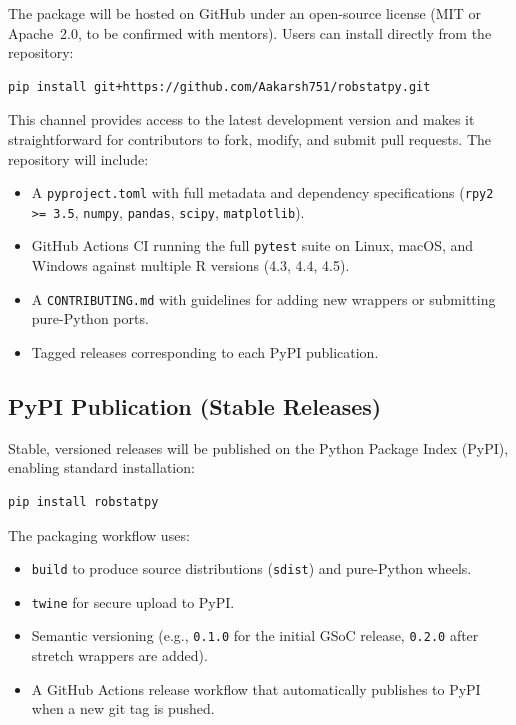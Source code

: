 \documentclass[11pt, a4paper]{article}
\begin{document}
The package will be hosted on GitHub under an open-source license
(MIT or Apache~2.0, to be confirmed with mentors).
Users can install directly from the repository:

\begin{lstlisting}[style=python, title={\footnotesize GitHub installation}, numbers=none]
pip install git+https://github.com/Aakarsh751/robstatpy.git
\end{lstlisting}

\noindent
This channel provides access to the latest development version and
makes it straightforward for contributors to fork, modify, and submit
pull requests.
The repository will include:
\begin{itemize}[leftmargin=1.5em, itemsep=2pt]
  \item A \texttt{pyproject.toml} with full metadata and dependency
    specifications (\texttt{rpy2 >= 3.5}, \texttt{numpy},
    \texttt{pandas}, \texttt{scipy}, \texttt{matplotlib}).
  \item GitHub Actions CI running the full \texttt{pytest} suite on
    Linux, macOS, and Windows against multiple R versions (4.3, 4.4,
    4.5).
  \item A \texttt{CONTRIBUTING.md} with guidelines for adding new
    wrappers or submitting pure-Python ports.
  \item Tagged releases corresponding to each PyPI publication.
\end{itemize}

\subsection{PyPI Publication (Stable Releases)}

Stable, versioned releases will be published on the Python Package Index
(PyPI), enabling standard installation:

\begin{lstlisting}[style=python, title={\footnotesize PyPI installation}, numbers=none]
pip install robstatpy
\end{lstlisting}

\noindent
The packaging workflow uses:
\begin{itemize}[leftmargin=1.5em, itemsep=2pt]
  \item \texttt{build} to produce source distributions (\texttt{sdist})
    and pure-Python wheels.
  \item \texttt{twine} for secure upload to PyPI.
  \item Semantic versioning (e.g., \texttt{0.1.0} for the initial GSoC
    release, \texttt{0.2.0} after stretch wrappers are added).
  \item A GitHub Actions release workflow that automatically publishes
    to PyPI when a new git tag is pushed.
\end{itemize}
\end{document}
